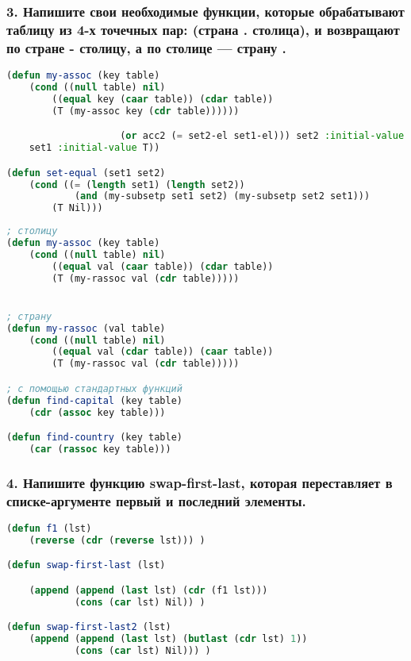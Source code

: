 \subsubsection*{3. Напишите свои необходимые функции, которые обрабатывают таблицу из 4-х точечных пар: (страна . столица), и возвращают по стране - столицу, а по столице — страну .}
\begin{lstlisting}[language=Lisp]
(defun my-assoc (key table)
	(cond ((null table) nil)
		((equal key (caar table)) (cdar table))
		(T (my-assoc key (cdr table))))))

					(or acc2 (= set2-el set1-el))) set2 :initial-value Nil)))
	set1 :initial-value T))

(defun set-equal (set1 set2)
	(cond ((= (length set1) (length set2))
			(and (my-subsetp set1 set2) (my-subsetp set2 set1)))
		(T Nil)))
\end{lstlisting}


\begin{lstlisting}[language=Lisp]
; столицу
(defun my-assoc (key table)
	(cond ((null table) nil)
		((equal val (caar table)) (cdar table))
		(T (my-rassoc val (cdr table)))))


; страну
(defun my-rassoc (val table)
	(cond ((null table) nil)
		((equal val (cdar table)) (caar table))
		(T (my-rassoc val (cdr table)))))

; с помощью стандартных функций
(defun find-capital (key table)
	(cdr (assoc key table)))

(defun find-country (key table)
	(car (rassoc key table)))

\end{lstlisting}

\subsubsection*{4. Напишите функцию swap-first-last, которая переставляет в списке-аргументе первый и последний элементы.}





\begin{lstlisting}[language=Lisp]
(defun f1 (lst)
	(reverse (cdr (reverse lst))) )

(defun swap-first-last (lst)

	(append (append (last lst) (cdr (f1 lst))) 
			(cons (car lst) Nil)) )

(defun swap-first-last2 (lst)
	(append (append (last lst) (butlast (cdr lst) 1)) 
			(cons (car lst) Nil))) )

\end{lstlisting}


